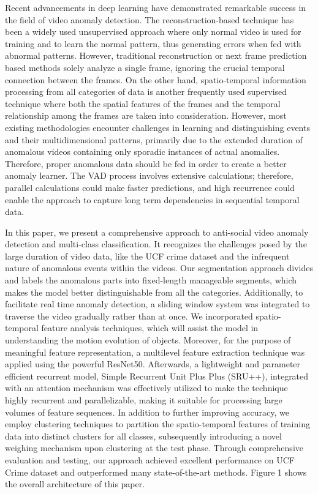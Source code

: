 \documentclass[runningheads]{llncs}
\begin{document}
Recent advancements in deep learning have demonstrated remarkable success in the field of video anomaly detection. The reconstruction-based technique has been a widely used unsupervised approach where only normal video is used for training and to learn the normal pattern, thus generating errors when fed with abnormal patterns. However,  traditional reconstruction or next frame prediction based methods solely analyze a single frame, ignoring the crucial temporal connection between the frames. On the other hand, spatio-temporal information processing from all categories of data is another frequently used supervised technique where both the spatial features of the frames and the temporal relationship among the frames are taken into consideration. However, most existing methodologies encounter challenges in learning and distinguishing events and their multidimensional patterns, primarily  due to the extended duration of anomalous videos containing only sporadic instances of  actual anomalies.\cite{challenges} Therefore, proper anomalous data should be fed in order to create a better anomaly learner. The VAD process involves extensive calculations; therefore, parallel calculations could make faster predictions, and high recurrence could enable the approach to capture long term dependencies in sequential temporal data.

In this paper, we present a comprehensive approach to anti-social video anomaly detection and multi-class classification. It recognizes the challenges posed by the large duration of video data, like the UCF crime dataset and the infrequent nature of anomalous events within the videos. Our segmentation approach divides and labels the anomalous parts into fixed-length manageable segments, which makes the model better distinguishable from all the categories. Additionally, to facilitate real time anomaly detection, a sliding window system was integrated to traverse the video gradually rather than at once. We incorporated spatio-temporal feature analysis techniques, which will assist the model in understanding the motion evolution of objects. Moreover, for the purpose of meaningful feature representation, a multilevel feature extraction technique was applied using the powerful ResNet50. Afterwards, a lightweight and parameter efficient recurrent model, Simple Recurrent Unit Plus Plus (SRU++), integrated with an attention mechanism was effectively utilized to make the technique highly recurrent and parallelizable, making it suitable for processing large volumes of feature sequences. In addition to further improving accuracy, we employ clustering techniques to partition the spatio-temporal features of training data into distinct clusters for all classes, subsequently introducing a novel weighing mechanism upon clustering at the test phase. Through comprehensive evaluation and testing, our approach achieved excellent performance on UCF Crime dataset and outperformed many state-of-the-art methods. Figure 1 shows the overall architecture of this paper. 
\end{document}
